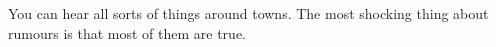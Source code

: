 \startcontents[segments]

\renewcommand{\region}{Town}

\begin{multicols}{2}


You can hear all sorts of things around towns.
The most shocking thing about rumours is that most of them are true.



\end{multicols}


\stopcontents[segments]
